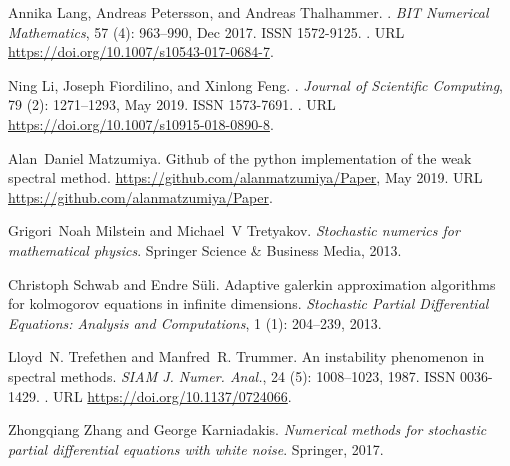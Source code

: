 \documentclass[]{interact}
\theoremstyle{plain}%
\theoremstyle{definition}
\theoremstyle{remark}
\begin{document}
\begin{thebibliography}{20}
Annika Lang, Andreas Petersson, and Andreas Thalhammer.
.
\newblock \emph{BIT Numerical Mathematics}, 57 (4):
  963–990, Dec 2017.
\newblock ISSN 1572-9125.
\newblock {}.
\newblock URL \url{https://doi.org/10.1007/s10543-017-0684-7}.

Ning Li, Joseph Fiordilino, and Xinlong Feng.
.
\newblock \emph{Journal of Scientific Computing}, 79 (2):
  1271--1293, May 2019.
\newblock ISSN 1573-7691.
\newblock {}.
\newblock URL \url{https://doi.org/10.1007/s10915-018-0890-8}.

Alan~Daniel Matzumiya.
\newblock Github of the python implementation of the weak spectral method.
\newblock \url{https://github.com/alanmatzumiya/Paper}, May 2019.
\newblock URL \url{https://github.com/alanmatzumiya/Paper}.

Grigori~Noah Milstein and Michael~V Tretyakov.
\newblock \emph{Stochastic numerics for mathematical physics}.
\newblock Springer Science \& Business Media, 2013.

Christoph Schwab and Endre S{\"u}li.
\newblock Adaptive galerkin approximation algorithms for kolmogorov equations
  in infinite dimensions.
\newblock \emph{Stochastic Partial Differential Equations: Analysis and
  Computations}, 1 (1): 204--239, 2013.

Lloyd~N. Trefethen and Manfred~R. Trummer.
\newblock An instability phenomenon in spectral methods.
\newblock \emph{SIAM J. Numer. Anal.}, 24 (5): 1008--1023,
  1987.
\newblock ISSN 0036-1429.
\newblock {}.
\newblock URL \url{https://doi.org/10.1137/0724066}.

Zhongqiang Zhang and George Karniadakis.
\newblock \emph{Numerical methods for stochastic partial differential equations
  with white noise}.
\newblock Springer, 2017.

\end{thebibliography}
\end{document}
